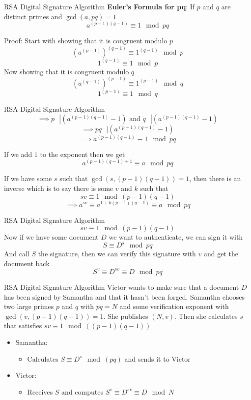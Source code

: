 \documentclass{beamer}
\begin{document}
\begin{frame}{RSA Digital Signature Algorithm}
    \textbf{Euler's Formula for pq}:
    If $p$ and $q$ are distinct primes and $\gcd(a,pq) = 1$
    \[a^{(p-1)(q-1)} \equiv 1 \mod pq\]

    Proof: 
    Start with showing that it is congruent modulo $p$
    \[ \left( a^{(p-1)}\right)^{(q-1)} \equiv 1^{(q-1)} \mod p\]
    \[1^{(q-1)} \equiv 1 \mod p \]
    Now showing that it is congruent modulo $q$
    \[ \left( a^{(q-1)}\right)^{(p-1)} \equiv 1^{(p-1)} \mod q\]
    \[1^{(p-1)} \equiv 1 \mod q \]
\end{frame}

\begin{frame}{RSA Digital Signature Algorithm}
    \[\implies p \text{ } | \left( a^{(p-1)(q-1)} - 1 \right) \text{  and }  q \text{ } |\left( a^{(p-1)(q-1)} - 1 \right)\]
    \[\implies pq \text{ } | \left( a^{(p-1)(q-1)} - 1 \right) \]
    \[\implies a^{(p-1)(q-1)} \equiv 1 \mod pq \]
    
    If we add $1$ to the exponent then we get
    \[a^{(p-1)(q-1) + 1} \equiv a \mod pq\]

    If we have some $s$ such that $\gcd(s, (p-1)(q-1)) = 1$, then there is an inverse which is to say there is some $v$ and $k$ such that
    \[ sv \equiv 1  \mod(p-1)(q-1)\]
    \[\implies a^{sv} \equiv a^{1 + k(p-1)(q-1)} \equiv a \mod pq \]
    
\end{frame}

\begin{frame}{RSA Digital Signature Algorithm}
    \[ sv \equiv 1 \mod(p-1)(q-1)\]
    Now if we have some document $D$ we want to authenticate, we can sign it with
    \[S \equiv D^{s} \mod pq\]
    And call $S$ the signature, then we can verify this signature with $v$ and get the document back
    \[S^{v} \equiv D^{sv} \equiv D \mod pq\]
\end{frame}

\begin{frame}{RSA Digital Signature Algorithm}
    Victor wants to make sure that a document $D$ has been signed by Samantha and that it hasn't been forged. Samantha chooses two large primes $p$ and $q$ with $pq = N$ and some verification exponent with $\gcd(v, (p-1)(q-1)) = 1$. She publishes $(N, v)$. Then she calculates $s$ that satisfies $sv \equiv 1 \mod((p-1)(q-1))$
    
    \begin{itemize}
        \item Samantha:
        \begin{itemize}
            \item Calculates $S \equiv D^s \mod(pq)$ and sends it to Victor
        \end{itemize}
        \item Victor:
        \begin{itemize}
            \item Receives $S$ and computes $S^{v} \equiv D^{sv} \equiv D \mod N$
        \end{itemize}
    \end{itemize}
\end{frame}
\end{document}
